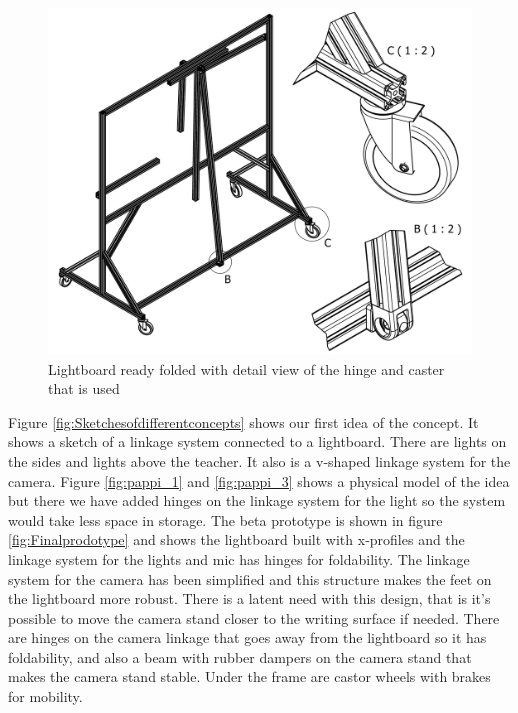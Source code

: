 \documentclass[a4paper]{jpconf}
\begin{document}
\begin{figure}
	\centering
	\includegraphics[width=1\linewidth]{frame2.pdf}
	\caption{Lightboard ready folded with detail view of the hinge and caster that is used}
	\label{fig:Finalprodotype2}
\end{figure}






Figure \ref{fig:Sketchesofdifferentconcepts} shows our first idea of the concept.  It shows a sketch of a linkage system connected to a lightboard.
There are lights on the sides and lights above the teacher.
It also is a v-shaped linkage system for the camera.
Figure \ref{fig:pappi_1} and \ref{fig:pappi_3} shows a physical model of the idea but there we have added hinges on the linkage system for the light so the system would take less space in storage.
The beta prototype is shown in figure \ref{fig:Finalprodotype} and shows the lightboard built with x-profiles and the linkage system for the lights and mic has hinges for foldability.
The linkage system for the camera has been simplified and this structure makes the feet on the lightboard more robust. There is a latent need with this design, that is it's possible to move the camera stand closer to the writing surface if needed.
There are hinges on the camera linkage that goes away from the lightboard so it has foldability, and also a beam with rubber dampers on the camera stand that makes the camera stand stable.
Under the frame are castor wheels with brakes for mobility.
\end{document}
